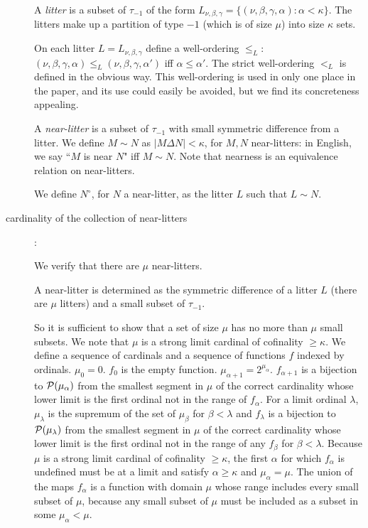 \documentclass[112pt]{article}
\begin{document}
\begin{description}
A {\em litter\/} is a subset of $\tau_{-1}$ of the form $L_{\nu,\beta,\gamma} = \{(\nu,\beta,\gamma,\alpha):\alpha<\kappa\}$.  The litters make up a partition of type $-1$
(which is of size $\mu$) into size $\kappa$ sets.

On each litter $L =  L_{\nu,\beta,\gamma}$ define a well-ordering $\leq_L$:  $(\nu,\beta,\gamma,\alpha) \leq_L (\nu,\beta,\gamma,\alpha')$  iff $\alpha\leq \alpha'$.
The strict well-ordering $<_L$ is defined in the obvious way.  This well-ordering is used in only one place in the paper, and its use could easily be avoided, but we find its concreteness appealing.

A {\em near-litter\/} is a subset of $\tau_{-1}$ with small symmetric difference from a litter.  We define $M \sim N$ as $|M \Delta N|<\kappa$, for $M,N$ near-litters:  in English, we say ``$M$ is near $N$" iff $M \sim N$.  Note that nearness is an equivalence relation on near-litters.  

We define $N^\circ$, for $N$ a near-litter, as the litter $L$ such that $L \sim N$.  


\item[cardinality of the collection of near-litters]:

 We verify that there are $\mu$ near-litters.

A near-litter is determined as the symmetric difference of a litter $L$ (there are $\mu$ litters) and a small subset of
$\tau_{-1}$.

So it is sufficient to show that a set of size $\mu$ has no more than $\mu$ small subsets.  We note that $\mu$ is
a strong limit cardinal of cofinality $\geq\kappa$.  We define a sequence of cardinals and a sequence of functions $f$ indexed by ordinals.
$\mu_0 = 0$.  $f_0$ is the empty function.  $\mu_{\alpha+1}=2^{\mu_\alpha}$.  $f_{\alpha+1}$ is a bijection
to ${\cal P}({\mu_\alpha})$ from the smallest segment in $\mu$ of the correct cardinality whose lower limit is the first ordinal not in the range of $f_{\alpha}$.  For a limit ordinal $\lambda$, $\mu_{\lambda}$ is the supremum of the set of
$\mu_\beta$ for $\beta<\lambda$ and $f_{\lambda}$ is a bijection to ${\cal P}({\mu_\lambda})$ from the smallest
segment in $\mu$ of the correct cardinality whose lower limit is the first ordinal not in the range of any
$f_\beta$ for $\beta<\lambda$.   Because $\mu$ is a strong limit cardinal of cofinality $\geq \kappa$, the first $\alpha$ for which $f_\alpha$ is undefined must be at a limit and satisfy $\alpha \geq \kappa$ and $\mu_\alpha = \mu$.   The union of the maps $f_\alpha$ is a function with domain $\mu$ whose range includes every small subset of $\mu$, because any small subset of $\mu$ must be included as a subset in some $\mu_\alpha<\mu$.


\end{description}
\end{document}
